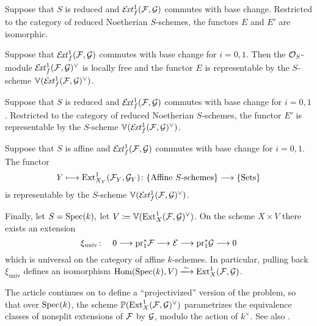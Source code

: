 \begin{proposition}
	Suppose that $S$ is reduced and $\mathcal{E}\!\mathit{xt}^1_f(\mathcal{F},\mathcal{G})$ commutes with base change. Restricted to the category of reduced Noetherian $S$-schemes, the functors $E$ and $E'$ are isomorphic.
\end{proposition}

\begin{proposition}
	Suppose that $\mathcal{E}\!\mathit{xt}^1_f(\mathcal{F},\mathcal{G})$ commutes with base change for $i=0,1$. Then the $\mathcal{O}_S$-module $\mathcal{E}\!\mathit{xt}^1_f(\mathcal{F},\mathcal{G})^\vee$ is locally free and the functor $E$ is representable by the $S$-scheme $\mathbb{V}(\mathcal{E}\!\mathit{xt}^1_f(\mathcal{F},\mathcal{G})^\vee)$.
\end{proposition}

\begin{corollary}
	Suppose that $S$ is reduced and $\mathcal{E}\!\mathit{xt}^1_f(\mathcal{F},\mathcal{G})$ commutes with base change for $i=0,1$. Restricted to the category of reduced Noetherian $S$-schemes, the functor $E'$ is representable by the $S$-scheme $\mathbb{V}(\mathcal{E}\!\mathit{xt}^1_f(\mathcal{F},\mathcal{G})^\vee)$.
\end{corollary}

\begin{corollary}
	Suppose that $S$ is affine and $\mathcal{E}\!\mathit{xt}^1_f(\mathcal{F},\mathcal{G})$ commutes with base change for $i=0,1$. The functor
	\[
		Y \longmapsto \operatorname{Ext}^1_{X_Y}(\mathcal{F}_Y,\mathcal{G}_Y)
		\colon \{\text{Affine $S$-schemes}\} \longrightarrow \{\text{Sets}\}
	\]
	is representable by the $S$-scheme $\mathbb{V}(\mathcal{E}\!\mathit{xt}^1_f(\mathcal{F},\mathcal{G})^\vee)$.
\end{corollary}

\begin{corollary} \label{cor:universal-extension}
	Finally, let $S = \operatorname{Spec}(k),$ let $V \coloneqq \mathbb{V}(\operatorname{Ext}^1_X(\mathcal{F},\mathcal{G})^\vee)$. On the scheme $X\times V$ there exists an extension
	\[
		\xi_{\mathrm{univ}} \colon \quad 0 \longrightarrow \mathrm{pr}_1^{*}\mathcal{F} \longrightarrow \mathcal{E} \longrightarrow \mathrm{pr}_1^{*}\mathcal{G} \longrightarrow 0
	\]
	which is universal on the category of affine $k$-schemes. In particular, pulling back $\xi_{\mathrm{univ}}$ defines an isomorphism $\Hom(\Spec(k),V)\xlongrightarrow{\sim} \Ext^1_{X}(\mc{F},\mc{G})$.
\end{corollary}

\begin{remark}
	The article \cite{lange-universal-extensions} continues on to define a ``projectivized'' version of the problem, so that over $\operatorname{Spec}(k)$, the scheme $\mathbb{P}(\operatorname{Ext}^1_X(\mathcal{F},\mathcal{G})^\vee)$ parametrizes the equivalence classes of nonsplit extensions of $\mathcal{F}$ by $\mathcal{G}$, modulo the action of $k^{\times}$. See also \cite[Example 2.1.12]{huybrechts-lehn-sheaves}.
\end{remark}

